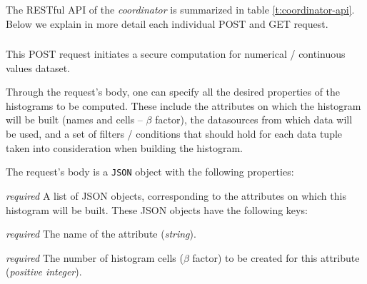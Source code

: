 The RESTful API of the \textit{coordinator} is summarized in table \ref{t:coordinator-api}.
Below we explain in more detail each individual POST and GET request.



\subsubsection[/smpc/histogram/numerical POST request]{\protect{}}\label{sss:post1}

  This POST request initiates a secure computation for numerical / continuous values dataset.
  \begin{description}[labelwidth=5em, leftmargin=\dimexpr\labelwidth+\labelsep\relax]
       \item[Request:] Through the request's body, one can specify all the desired properties of the histograms to be computed.
  These include the attributes on which the histogram will be built (names and cells -- $\beta$ factor), the datasources from which data will be used, and a set of filters / conditions that should hold for each data tuple taken into consideration when building the histogram.


  The request's body is a \texttt{JSON} object with the following properties:

\begin{description}[labelwidth=6em, leftmargin=\dimexpr\labelwidth+\labelsep\relax]

    \item[\texttt{attributes}:] {\color{red}\textit{required}} A list of JSON objects, corresponding to the attributes on which this histogram will be built.
    These JSON objects have the following keys:

    \begin{description}[labelwidth=5em, leftmargin=\dimexpr\labelwidth+\labelsep\relax]
        \item[\texttt{name}:] {\color{red}\textit{required}} The name of the attribute (\textit{string}).

        \item[\texttt{cells}:] {\color{red}\textit{required}} The number of histogram cells ($\beta$ factor) to be created for this attribute (\textit{positive integer}).
    \end{description}


\end{description}
\end{description}
